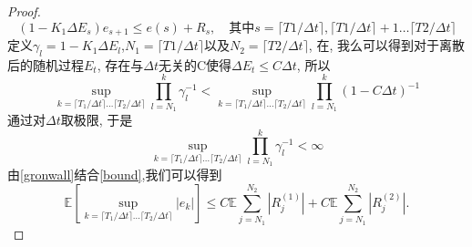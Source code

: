 \begin{proof}
\begin{equation}
		(1-K_1\Delta E_s)e_{s+1}\leq e(s)+R_{s},\quad\text{其中}s=\lceil T1/\Delta t \rceil,\lceil T1/\Delta t \rceil+1 \ldots \lceil T2/\Delta t \rceil
	\end{equation}
	定义$\gamma_l = 1-K_1\Delta E_l$,$N_1 = \lceil T1/\Delta t \rceil$以及$N_2 = \lceil T2/\Delta t \rceil$, 在\cite{li2023convergence}, 我么可以得到对于离散后的随机过程$E_t$, 存在与$\Delta t$无关的C使得$\Delta E_t \le C \Delta t$, 所以
	\begin{equation}\label{bound}
	\sup\limits_{k=\lceil T_1/\Delta t \rceil\ldots \lceil T_2/\Delta t \rceil}	\prod\limits_{l=N_1}^{k}\gamma_l^{-1} <\sup\limits_{k=\lceil T_1/\Delta t \rceil\ldots \lceil T_2/\Delta t \rceil}	\prod\limits_{l=N_1}^{k}(1-C\Delta t)^{-1}
	\end{equation}
	通过对$\Delta t$取极限, 于是
	\[
	\sup\limits_{k=\lceil T_1/\Delta t \rceil\ldots \lceil T_2/\Delta t \rceil}	\prod\limits_{l=N_1}^{k}\gamma_l^{-1} <\infty
	\]
	由\cref{gronwall}结合\cref{bound},我们可以得到
	$$\mathbb{E}  \left[\sup\limits_{k=\lceil T_1/\Delta t \rceil\ldots \lceil T_2/\Delta t \rceil}|e_k|\right] \leq C\mathbb{E}\sum\limits_{j=N_1}^{N_2}\left|R_{j}^{(1)} \right| + C\mathbb{E}\sum\limits_{j=N_1}^{N_2}\left|R_{j}^{(2)} \right|.$$
	

\end{proof}
